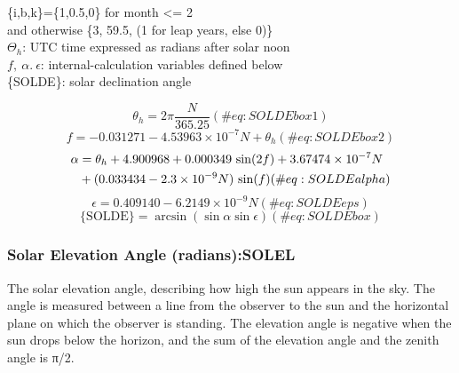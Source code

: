 \documentclass[
  english,
]{book}
\begin{document}
\{i,b,k\}=\{1,0.5,0\} for month \textless= 2\\
\hspace*{0.333em}\hspace*{0.333em}\hspace*{0.333em}\hspace*{0.333em}\hspace*{0.333em}\hspace*{0.333em}and
otherwise \{3, 59.5, (1 for leap years, else 0)\}\\
\(\Theta_h\): UTC time expressed as radians after solar noon\\
\(f,\ \alpha.\ \epsilon\): internal-calculation variables defined
below\\
\{SOLDE\}: solar declination angle

\begin{equation}
\theta_{h}=2\pi\frac{N}{365.25}
(\#eq:SOLDEbox1)
\end{equation} \begin{equation}
f=-0.031271-4.53963\times10^{-7}N+\theta_{h}
(\#eq:SOLDEbox2)
\end{equation} \begin{align}
\alpha  &=  \theta_{h}+4.900968+0.000349\,\sin(2f)+3.67474\times10^{-7}N\notag \\
        &+(0.033434-2.3\times10^{-9}N)\,\sin(f)
(\#eq:SOLDEalpha)
\end{align} \begin{equation}
\epsilon=0.409140-6.2149\times10^{-9}N
(\#eq:SOLDEeps)
\end{equation} \begin{equation}
\mathrm{{\{SOLDE\}}=}\arcsin(\sin\alpha\sin\epsilon)
(\#eq:SOLDEbox)
\end{equation}

\hypertarget{solel}{%
\subsubsection*{Solar Elevation Angle (radians):SOLEL}\label{solel}}

The solar elevation angle, describing how high the sun appears in the
sky. The angle is measured between a line from the observer to the sun
and the horizontal plane on which the observer is standing. The
elevation angle is negative when the sun drops below the horizon, and
the sum of the elevation angle and the zenith angle is {π/2.}
\end{document}
